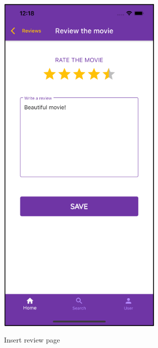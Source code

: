 \documentclass[12pt, a4paper]{article}
\numberwithin{figure}{section}
\begin{document}
\begin{center}
\begin{minipage}[t]{0.31\textwidth}
\begin{figure}[H]
			\includegraphics[width=0.71\textwidth]{images/final/insertReview.png}\\
			\caption{Insert review page}
		\end{figure}
	\end{minipage}
	\hspace{0.015\linewidth}
	\begin{minipage}[t]{0.31\textwidth}
		\begin{figure}[H]
			\centering

\end{figure}
\end{minipage}
\end{center}
\end{document}
